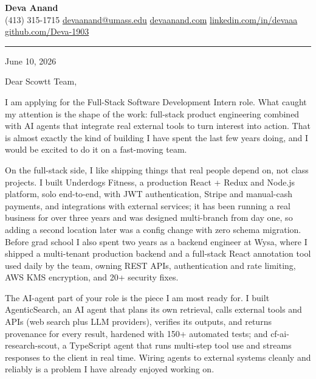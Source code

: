 \documentclass[letterpaper,11pt]{article}
\begin{document}
\pagestyle{empty}
\begin{center}
    {\LARGE \bfseries \textcolor{ResumeNavy}{Deva Anand}} \\ \vspace{4pt}
    \small
    (413) 315-1715 \enspace\textbar\enspace
    \href{mailto:devaanand@umass.edu}{devaanand@umass.edu} \enspace\textbar\enspace
    \href{https://devaanand.com}{devaanand.com} \enspace\textbar\enspace
    \href{https://linkedin.com/in/devaaa/}{linkedin.com/in/devaaa} \enspace\textbar\enspace
    \href{https://github.com/Deva-1903}{github.com/Deva-1903}
\end{center}
\vspace{6pt}

\textcolor{ResumeNavy}{\rule{\textwidth}{0.8pt}}

\vspace{4pt}

June 10, 2026

Dear Scowtt Team,

I am applying for the Full-Stack Software Development Intern role. What caught my attention is the shape of the work: full-stack product engineering combined with AI agents that integrate real external tools to turn interest into action. That is almost exactly the kind of building I have spent the last few years doing, and I would be excited to do it on a fast-moving team.

On the full-stack side, I like shipping things that real people depend on, not class projects. I built Underdogs Fitness, a production React + Redux and Node.js platform, solo end-to-end, with JWT authentication, Stripe and manual-cash payments, and integrations with external services; it has been running a real business for over three years and was designed multi-branch from day one, so adding a second location later was a config change with zero schema migration. Before grad school I also spent two years as a backend engineer at Wysa, where I shipped a multi-tenant production backend and a full-stack React annotation tool used daily by the team, owning REST APIs, authentication and rate limiting, AWS KMS encryption, and 20+ security fixes.

The AI-agent part of your role is the piece I am most ready for. I built AgenticSearch, an AI agent that plans its own retrieval, calls external tools and APIs (web search plus LLM providers), verifies its outputs, and returns provenance for every result, hardened with 150+ automated tests; and cf-ai-research-scout, a TypeScript agent that runs multi-step tool use and streams responses to the client in real time. Wiring agents to external systems cleanly and reliably is a problem I have already enjoyed working on.
\end{document}

